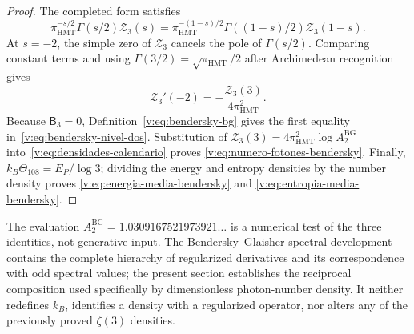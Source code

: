 \begin{proof}
The completed form satisfies
\[
 \pi_{\mathrm{HMT}}^{-s/2}\Gamma(s/2)\mathcal Z_3(s)
 =\pi_{\mathrm{HMT}}^{-(1-s)/2}
  \Gamma((1-s)/2)\mathcal Z_3(1-s).
\]
At \(s=-2\), the simple zero of \(\mathcal Z_3\) cancels the pole of
\(\Gamma(s/2)\). Comparing constant terms and using
\(\Gamma(3/2)=\sqrt{\pi_{\mathrm{HMT}}}/2\) after Archimedean
recognition gives
\[
 \mathcal Z_3'(-2)=-\frac{\mathcal Z_3(3)}{4\pi_{\mathrm{HMT}}^2}.
\]
Because \(\mathsf B_3=0\), Definition~\eqref{v:eq:bendersky-bg}
gives the first equality in~\eqref{v:eq:bendersky-nivel-dos}.
Substitution of
\(\mathcal Z_3(3)=4\pi_{\mathrm{HMT}}^2\log A_2^{\mathrm{BG}}\)
into~\eqref{v:eq:densidades-calendario} proves
\eqref{v:eq:numero-fotones-bendersky}. Finally,
\(k_B\Theta_{108}=E_P/\log3\); dividing the energy and entropy
densities by the number density proves
\eqref{v:eq:energia-media-bendersky} and
\eqref{v:eq:entropia-media-bendersky}.
\end{proof}

The evaluation \(A_2^{\mathrm{BG}}=1.0309167521973921\ldots\) is a
numerical test of the three identities, not generative input. The
Bendersky--Glaisher spectral development contains the complete hierarchy of
regularized derivatives and its correspondence with odd spectral values; the present section establishes the
reciprocal composition used specifically by dimensionless photon-number
density. It neither
redefines \(k_B\), identifies a density with a regularized operator, nor
alters any of the previously proved \(\zeta(3)\) densities.

